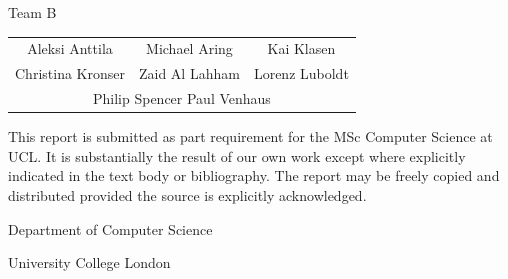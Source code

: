 \begin{center}
  \Large
  Team B
  \begin{table}[h]
    \centering
    \begin{tabular}{ c c c c c c }
      \multicolumn{2}{c}{Aleksi Anttila} & \multicolumn{2}{c}{Michael Aring} & \multicolumn{2}{c}{Kai Klasen}  \\
      \multicolumn{2}{c}{Christina Kronser} & \multicolumn{2}{c}{Zaid Al Lahham} & \multicolumn{2}{c}{Lorenz Luboldt} \\
       \multicolumn{6}{c}{Philip Spencer \hspace{0.5cm} Paul Venhaus}
    \end{tabular}
  \end{table}
  
  \vfill

  \begin{minipage}{0.8\textwidth}
    \justify
    \small
    This report is submitted as part requirement for the MSc Computer Science at UCL. It is substantially the result of our own work except where explicitly indicated in the text body or bibliography. The report may be freely copied and distributed provided the source is explicitly acknowledged.
  \end{minipage}
  
  \vfill
  
  \begin{minipage}{\textwidth}
    \centering
    \small
    Department of Computer Science
  \end{minipage}
  
  \vspace{0.125\parSepLength}

  \begin{minipage}{\textwidth}
    \centering
    \small
    University College London
  \end{minipage}
\end{center}
